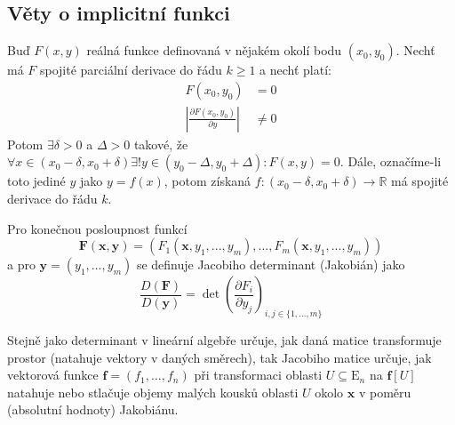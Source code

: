 \documentclass[../main.tex]{subfiles}
\begin{document}
\subsection{Věty o implicitní funkci}

\begin{theorem}
	Buď $F(x,y)$ reálná funkce definovaná v nějakém okolí bodu $(x_0, y_0)$. Nechť má $F$ spojité parciální
	derivace do řádu $k \geq 1$ a nechť platí:
	\begin{align*}
	    F(x_0, y_0) &= 0\\
	    \left| \frac{\partial F(x_0,y_0)}{\partial y} \right| &\neq 0
	\end{align*}
	Potom $ \exists \delta > 0$ a $\Delta > 0$ takové, že
	$\forall x \in (x_0 - \delta , x_0 + \delta) \exists! y \in (y_0 - \Delta , y_0 + \Delta): F(x,y) = 0$.
	Dále, označíme-li toto jediné $y$ jako $y = f(x)$, potom získaná
	$f: (x_0 - \delta , x_0 + \delta ) \to \mathbb{R}$ má spojité derivace do řádu $k$.
\end{theorem}



\begin{definition}
	Pro konečnou posloupnost funkcí
	\[ \mathbf{F}(\mathbf{x}, \mathbf{y}) =
	(F_1(\mathbf{x}, y_1, ..., y_m), ... , F_m(\mathbf{x}, y_1, ..., y_m)) \]
	a pro $\mathbf{y} = (y_1, ... , y_m)$ se definuje Jacobiho determinant (Jakobián) jako
	\[ \frac{D(\mathbf{F})}{D(\mathbf{y})} =
	\det \left( \frac{\partial F_i}{\partial y_j} \right)_{i,j \in \{ 1, ... , m\}} \]
\end{definition}

\begin{intuition}
	Stejně jako determinant v lineární algebře určuje, jak daná matice transformuje prostor (natahuje vektory v daných směrech), tak Jacobiho matice určuje, jak vektorová funkce $\mathbf{f} = \left(f_1, \ldots, f_n\right)$ při transformaci oblasti $U \subseteq \mathrm{E}_n$ na $\mathbf{f}[U]$ natahuje nebo stlačuje objemy malých kousků oblasti $U$ okolo $\mathbf{x}$ v poměru (absolutní hodnoty) Jakobiánu.
\end{intuition}
\end{document}
